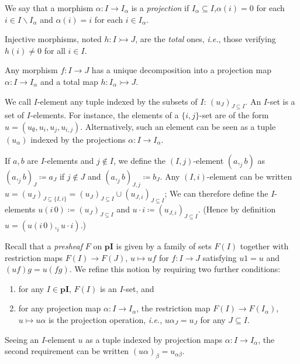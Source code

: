 \documentclass[english]{PaperTools/latex/lipics}
\def\pI{\ensuremath{\mathbf{pI}}}
\def\ie{\textit{i.e.}}
\begin{document}
  \begin{definition}[Projection]
    We say that a morphism $α : I → I_α$ is a \emph{projection} if $I_α ⊆ I$,$α(i) = 0$
    for each $i ∈ I \backslash I_α$ and $α(i) = i$ for each $i ∈ I_α$.
  \end{definition}
  \begin{definition}
  Injective morphisms, noted $h : I ↣ J$, are the \emph{total} ones, \ie,
  those verifying $h(i) ≠ 0$ for all $i ∈ I$.
  \end{definition}
  \begin{remark}
  Any morphism $f : I → J$ has a
  unique decomposition into a projection map
  $α : I → I_α$ and a total map $h : I_α ↣ J$.
%
  \end{remark}

\begin{definition}[$I$-set]
  We call $I$-element any tuple indexed by the subsets of $I$: $(u_J)_{J ⊆ I}$.
  An $I$-set is a set of $I$-elements.  For instance, the elements of a
  $\{i,j\}$-set are of the form $u = (u_∅,u_i,u_j,u_{i,j})$.
  Alternatively, such an element can be seen as a tuple $(u_α)$ indexed
  by the projections $α : I → I_α$.
\end{definition}
  If $a,b$ are $I$-elements and $j ∉ I$, we define the $(I,j)$-element
  $(a ,_j b)$ as $(a ,_j b)_J ≔ a_J$ if $j ∉ J$ and $(a ,_j b)_{J,j} ≔ b_J$.
  Any $(I,i)$-element can be written $u = (u_J)_{J ⊆ \{I,i\}} = (u_J)_{J ⊆ I} ∪ (u_{J,i})_{J ⊆ I}$;
  We can therefore define the $I$-elements $u (i\,0) ≔ (u_J)_{J ⊆ I}$ and $u · i ≔ (u_{J,i})_{J ⊆ I}$.
  (Hence by definition $u = (u (i\,0) ,_i u · i)$.)

\bigskip
Recall that a \emph{presheaf} $F$ on \pI{} is given by a family of sets $F(I)$ together
with restriction maps $F(I) → F(J)$, $u ↦ uf$ for $f : I → J$
satisfying $u1 = u$ and $(uf)g = u(fg)$. We refine this notion by requiring
two further conditions:
%
\begin{enumerate}
  \item for any $I ∈ \pI$, $F(I)$ is an $I$-set, and
  \item for any projection map $α : I → I_α$, the restriction
    map $F(I) → F(I_α)$, $u ↦ uα$ is the projection operation, \ie,
    $uα_J = u_J$ for any $J ⊆ I$.
\end{enumerate}
%
Seeing an $I$-element $u$ as a tuple indexed by projection maps
$α : I → I_α$, the second requirement can be written $(uα)_β = u_{αβ}$.
\end{document}

